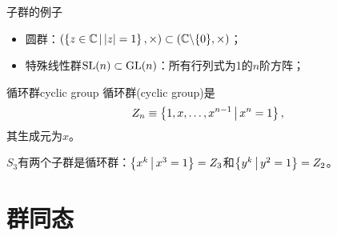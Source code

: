 \begin{example}{子群的例子}{}
	\begin{itemize}
		\item 圆群：$(\left\{z\in\mathbb C\,\middle\vert\,\left\lvert z\right\rvert=1\right\},\times)\subset(\mathbb C\backslash\{0\},\times)$；
		\item 特殊线性群$\operatorname{SL}(n)\subset\operatorname{GL}(n)$：所有行列式为1的$n$阶方阵；
	\end{itemize}
\end{example}

\begin{definition}{循环群}{cyclic group}
	循环群(cyclic group)是
	\begin{equation}
		Z_n\equiv\left\{1,x,\ldots,x^{n-1}\,\middle\vert\,x^n=1\right\},
	\end{equation}
	其生成元为$x$。
\end{definition}
\begin{example}{}{}
	$S_3$有两个子群是循环群：$\left\{x^k\,\middle\vert\,x^3=1\right\}=Z_3$和$\left\{y^k\,\middle\vert\,y^2=1\right\}=Z_2$。
\end{example}

\section{群同态}

